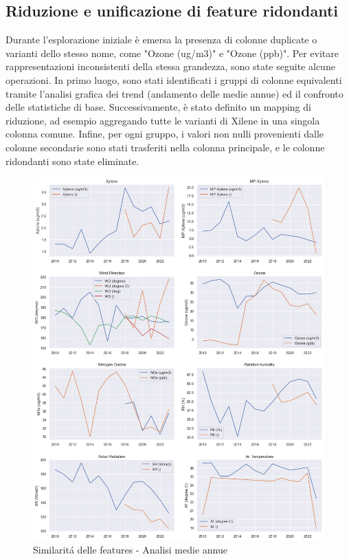 \documentclass[a4paper,12pt]{report}
\begin{document}
	\subsection{Riduzione e unificazione di feature ridondanti}
	Durante l'esplorazione iniziale è emersa la presenza di colonne duplicate o varianti dello stesso nome, come "Ozone (ug/m3)" e "Ozone (ppb)". Per evitare rappresentazioni inconsistenti della stessa grandezza, sono state seguite alcune operazioni. In primo luogo, sono stati identificati i gruppi di colonne equivalenti tramite l'analisi grafica dei trend (andamento delle medie annue) ed il confronto delle statistiche di base. Successivamente, è stato definito un mapping di riduzione, ad esempio aggregando tutte le varianti di Xilene in una singola colonna comune. Infine, per ogni gruppo, i valori non nulli provenienti dalle colonne secondarie sono stati trasferiti nella colonna principale, e le colonne ridondanti sono state eliminate.
	
	\begin{figure}[H]
		\centering
		\includegraphics[width=1.0\textwidth]{img/feat_red_pm.png}
		\caption{Similaritá delle features - Analisi medie annue}
	\end{figure}
	
\end{document}
